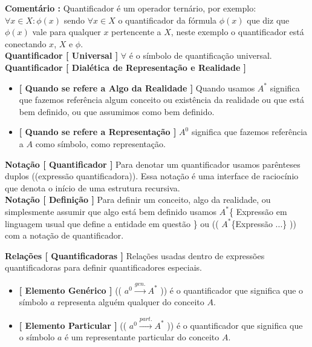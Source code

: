 \documentclass[10pt,a4paper]{report}
\begin{document}
\textbf{Comentário :} Quantificador é um operador ternário, por exemplo: $\forall x \in X: \phi(x)$ sendo $\forall x \in X$ o quantificador da fórmula $\phi(x)$ que diz que $\phi(x)$ vale para qualquer $x$ pertencente a $X$, neste exemplo o quantificador está conectando $x$, $X$ e $\phi$.\\

\textbf{Quantificador [ Universal ]} $\forall$ é o símbolo de quantificação universal.\\

\textbf{Quantificador [ Dialética de Representação e Realidade ]}

\begin{itemize}
	\item[ (i) ] \textbf{[ Quando se refere a Algo da Realidade ]} Quando usamos $A^{*}$ significa que fazemos referência algum conceito ou existência da realidade ou que está bem definido, ou que assumimos como bem definido.
	\item[ (ii) ] \textbf{[ Quando se refere a Representação ]} $A^{0}$ significa que fazemos referência a $A$ como símbolo, como representação.
\end{itemize}

\textbf{Notação [ Quantificador ]} Para denotar um quantificador usamos parênteses duplos ((expressão quantificadora)). Essa notação é uma interface de raciocínio que denota o início de uma estrutura recursiva. \\

\textbf{Notação [ Definição ]} Para definir um conceito, algo da realidade, ou simplesmente assumir que algo está bem definido usamos $A^{*}$\{ Expressão em linguagem usual que define a entidade em questão \} ou (( $A^{*}$\{Expressão ...\} )) com a notação de quantificador.

% 
\hspace{\baselineskip}

\textbf{Relações [ Quantificadoras ]} Relações usadas dentro de expressões quantificadoras para definir quantificadores especiais.

\begin{itemize}
	\item[ (i) ] \textbf{[ Elemento Genérico ]} (( $a^0 \overset{gen.}{\rightarrow} A^{*}$ )) é o quantificador que significa que o símbolo $a$ representa alguém qualquer do conceito $A$. %
	\item[ (ii) ] \textbf{[ Elemento Particular ]} (( $a^0 \overset{part.}{\rightarrow} A^{*}$ )) é o quantificador que significa que o símbolo $a$ é um representante particular do conceito $A$. %
\end{itemize}
\end{document}
